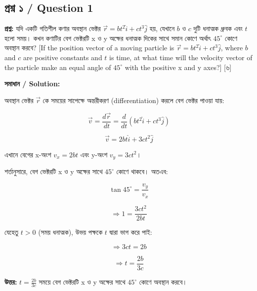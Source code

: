 \documentclass[11pt, a4paper]{article}
\begin{document}
\subsection*{প্রশ্ন ১ / Question 1}
\textbf{প্রশ্ন:} যদি একটি গতিশীল কণার অবস্থান ভেক্টর $\vec{r} = bt^2\hat{i} + ct^3\hat{j}$ হয়, যেখানে $b$ ও $c$ দুটি ধনাত্মক ধ্রুবক এবং $t$ হলো সময়। কখন কণাটির বেগ ভেক্টরটি x ও y অক্ষের ধনাত্মক দিকের সাথে সমান কোণে অর্থাৎ $45^\circ$ কোণে অবস্থান করবে? [If the position vector of a moving particle is $\vec{r} = bt^2\hat{i} + ct^3\hat{j}$, where $b$ and $c$ are positive constants and $t$ is time, at what time will the velocity vector of the particle make an equal angle of $45^\circ$ with the positive x and y axes?] [৬]

\vspace{0.8em}
\textbf{সমাধান / Solution:}

অবস্থান ভেক্টর $\vec{r}$ কে সময়ের সাপেক্ষে অন্তরীকরণ (differentiation) করলে বেগ ভেক্টর পাওয়া যায়:

$$\vec{v} = \frac{d\vec{r}}{dt} = \frac{d}{dt}(bt^2\hat{i} + ct^3\hat{j})$$

$$\vec{v} = 2bt\hat{i} + 3ct^2\hat{j}$$

এখানে বেগের x-অংশ $v_x = 2bt$ এবং y-অংশ $v_y = 3ct^2$।

শর্তানুসারে, বেগ ভেক্টরটি x ও y অক্ষের সাথে $45^\circ$ কোণে থাকবে। অতএব:

$$\tan 45^\circ = \frac{v_y}{v_x}$$

$$\Rightarrow 1 = \frac{3ct^2}{2bt}$$

যেহেতু $t > 0$ (সময় ধনাত্মক), উভয় পক্ষকে $t$ দ্বারা ভাগ করে পাই:

$$\Rightarrow 3ct = 2b$$

$$\Rightarrow t = \frac{2b}{3c}$$

\textbf{উত্তর:} $t = \frac{2b}{3c}$ সময়ে বেগ ভেক্টরটি x ও y অক্ষের সাথে $45^\circ$ কোণে অবস্থান করবে।

\vspace{1em}
\begin{center}
\end{center}
\end{document}
